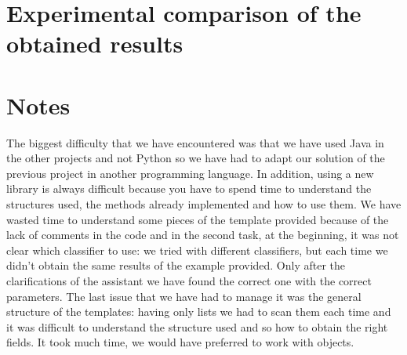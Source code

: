 \documentclass[10pt, a4paper]{article}
\begin{document}
	\section{Experimental comparison of the obtained results}
	
	
	\section{Notes}
	The biggest difficulty that we have encountered was that we have used Java in the other projects and not Python so we have had to adapt our solution of the previous project in another programming language. In addition, using a new library is always difficult because you have to spend time to understand the structures used, the methods already implemented and how to use them.
	We have wasted time to understand some pieces of the template provided because of the lack of comments in the code and in the second task, at the beginning, it was not clear which classifier to use: we tried with different classifiers, but each time we didn't obtain the same results of the example provided. Only after the clarifications of the assistant we have found the correct one with the correct parameters.
	The last issue that we have had to manage it was the general structure of the templates: having only lists we had to scan them each time and it was difficult to understand the structure used and so how to obtain the right fields. It took much time, we would have preferred to work with objects.    
		
\end{document}
